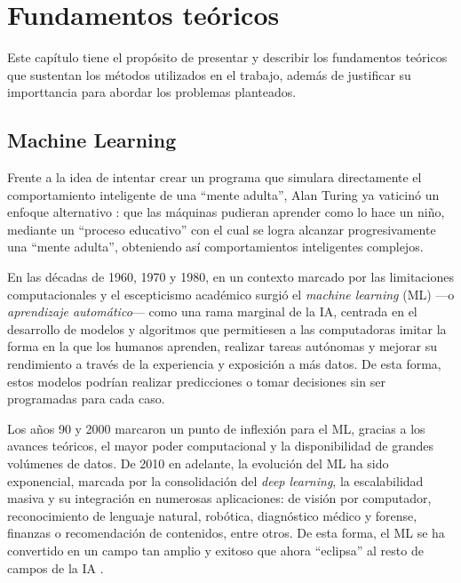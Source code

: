 \chapter{Fundamentos teóricos}

Este capítulo tiene el propósito de presentar y describir los fundamentos teóricos que sustentan los métodos 
utilizados en el trabajo, además de justificar su importtancia para abordar los problemas planteados.


\section{Machine Learning}

Frente a la idea de intentar crear un programa que simulara directamente el comportamiento inteligente de una ``mente 
adulta'', Alan Turing ya vaticinó un enfoque alternativo \cite{turing1950}: que las máquinas pudieran aprender como 
lo hace un niño, mediante un ``proceso educativo'' con el cual se logra alcanzar progresivamente una ``mente adulta'', 
obteniendo así comportamientos inteligentes complejos.


En las décadas de 1960, 1970 y 1980, en un contexto marcado por las limitaciones computacionales y el escepticismo 
académico surgió el \textit{machine learning} (ML) ---o \textit{aprendizaje automático}--- como una rama marginal de 
la IA, centrada en el desarrollo de modelos y algoritmos que permitiesen a las computadoras imitar la forma en la que 
los humanos aprenden, realizar tareas autónomas y mejorar su rendimiento a través de la experiencia y exposición a 
más datos. De esta forma, estos modelos podrían realizar predicciones o tomar decisiones sin ser programadas para 
cada caso.

Los años 90 y 2000 marcaron un punto de inflexión para el ML, gracias a los avances teóricos, el mayor poder 
computacional y la disponibilidad de grandes volúmenes de datos. De 2010 en adelante, la evolución del ML ha sido 
exponencial, marcada por la consolidación del \textit{deep learning}, la escalabilidad masiva y su integración en 
numerosas aplicaciones: de visión por computador, reconocimiento de lenguaje natural, robótica, diagnóstico médico 
y forense, finanzas o recomendación de contenidos, entre otros. De esta forma, el ML se ha convertido en un 
campo tan amplio y exitoso que ahora ``eclipsa'' al resto de campos de la IA \cite{domingos2015}.

